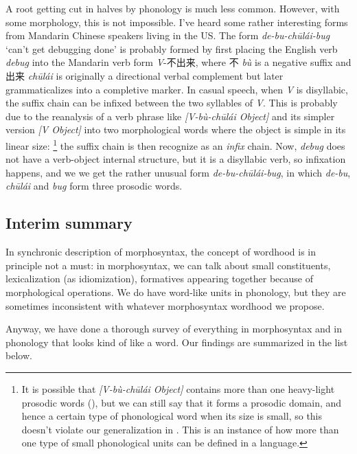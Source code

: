 \documentclass[a4paper, oneside, scheme=plain, 12pt]{article}
\newcommand{\form}[1]{\emph{#1}}
\newcommand{\translate}[1]{`#1'}
\begin{document}
A root getting cut in halves by phonology is much less common.
However, with some morphology, this is not impossible.
I've heard some rather interesting forms from Mandarin Chinese speakers living in the US.
The form \form{de-bu-chūlái-bug} \translate{can't get debugging done}
is probably formed by first placing the English verb \form{debug}
into the Mandarin verb form \form{V}-不出来,
where 不 \form{bù} is a negative suffix and 出来 \form{chūlái} is originally a directional verbal complement
but later grammaticalizes into a completive marker.
In casual speech, when \form{V} is disyllabic,
the suffix chain can be infixed between the two syllables of \form{V}.
This is probably due to the reanalysis of a verb phrase like \form{[V-bù-chūlái Object]}
and its simpler version \form{[V Object]} into two morphological words
where the object is simple in its linear size:%
\footnote{
    It is possible that \form{[V-bù-chūlái Object]} contains more than one heavy-light prosodic words
    (),
    but we can still say that it forms a prosodic domain,
    and hence a certain type of phonological word when its size is small,
    so this doesn't violate our generalization in .
    This is an instance of how more than one type of small phonological units can be defined in a language.
}
the suffix chain is then recognize as an \emph{infix} chain.
Now, \form{debug} does not have a verb-object internal structure,
but it is a disyllabic verb, so infixation happens,
and we we get the rather unusual form \form{de-bu-chūlái-bug},
in which \form{de-bu}, \form{chūlái} and \form{bug} form three prosodic words.

\subsection{Interim summary}\label{sec:all-wordhood}

In synchronic description of morphosyntax,
the concept of wordhood is in principle not a must:
in morphosyntax, we can talk about small constituents, lexicalization (as idiomization),
formatives appearing together because of morphological operations.
We do have word-like units in phonology,
but they are sometimes inconsistent with whatever morphosyntax wordhood we propose.

Anyway, we have done a thorough survey of everything in morphosyntax and in phonology that looks kind of like a word. 
Our findings are summarized in the list below.
\end{document}
